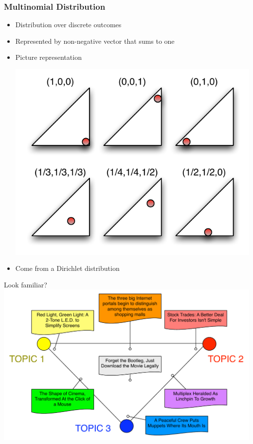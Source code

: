 \begin{frame}
	\frametitle{Multinomial Distribution}

	\begin{itemize}
		\item Distribution over discrete outcomes
		\item Represented by non-negative vector that sums to one
		\item Picture representation
	\begin{center}
\includegraphics[width=0.4\linewidth]{topic_models/multinomial}
	\end{center}
		\pause
		\item Come from a Dirichlet distribution

	\end{itemize}

        \pause

        \vspace{-5cm}

        \begin{block}{Look familiar?}
          \centering
          \includegraphics[width=0.7\linewidth]{topic_models/nyt_documents}
        \end{block}

\end{frame}

